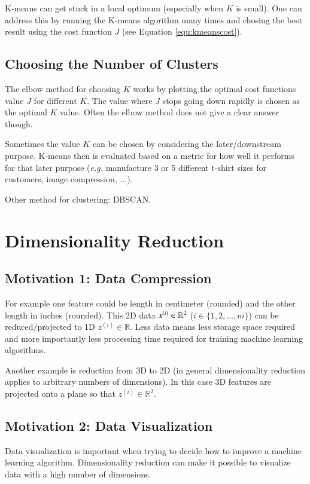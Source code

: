 \documentclass[a4paper,twoside,10pt]{article}
\begin{document}
K-means can get stuck in a local optimum (especially when $K$ is small). One can address this by running the K-means algorithm many times and chosing the best result using the cost function $J$ (see Equation \ref{equ:kmeanscost}).

\subsection{Choosing the Number of Clusters}
The elbow method for choosing $K$ works by plotting the optimal cost functions value $J$ for different $K$.
The value where $J$ stops going down rapidly is chosen as the optimal $K$ value.
Often the elbow method does not give a clear answer though.

Sometimes the value $K$ can be chosen by considering the later/downstream purpose.
K-means then is evaluated based on a metric for how well it performs for that later purpose
(\emph{e.g.} manufacture 3 or 5 different t-shirt sizes for customers, image compression, ...).

Other method for clustering: DBSCAN.

\section{Dimensionality Reduction}
\subsection{Motivation 1: Data Compression}
For example one feature could be length in centimeter (rounded) and the other length in inches (rounded).
This 2D data $x^{(i)}\in\mathbb{R}^2$ ($i\in\{1,2,\ldots,m\}$) can be reduced/projected to 1D $z^{(i)}\in\mathbb{R}$.
Less data means less storage space required and more importantly less processing time required for training machine learning algorithms.

Another example is reduction from 3D to 2D (in general dimensionality reduction applies to arbitrary numbers of dimensions).
In this case 3D features are projected onto a plane so that $z^{(i)}\in\mathbb{R}^2$.

\subsection{Motivation 2: Data Visualization}
Data visualization is important when trying to decide how to improve a machine learning algorithm.
Dimensionality reduction can make it possible to visualize data with a high number of dimensions.
\end{document}
